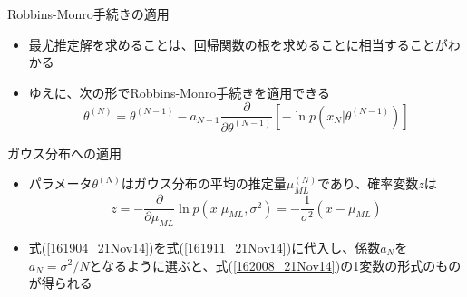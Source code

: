 \begin{frame}{Robbins-Monro手続きの適用}
 \begin{itemize}
  \item 最尤推定解を求めることは、回帰関数の根を求めることに相当することがわかる
  \item ゆえに、次の形でRobbins-Monro手続きを適用できる
        \begin{equation}
         \theta^{(N)}=\theta^{(N-1)}-a_{N-1}\frac{\partial}{\partial \theta^{(N-1)}}[-\ln p(x_N|\theta^{(N-1)})]\label{161911_21Nov14}
        \end{equation}
 \end{itemize}
\end{frame}

\begin{frame}{ガウス分布への適用}
 \begin{itemize}
  \item パラメータ$\theta^{(N)}$はガウス分布の平均の推定量$\mu_{ML}^{(N)}$であり、確率変数$z$は
        \begin{equation}
         z=-\frac{\partial}{\partial \mu_{ML}} \ln p(x|\mu_{ML}, \sigma^2) = -\frac{1}{\sigma^2}(x-\mu_{ML})\label{161904_21Nov14}
        \end{equation}
  \item 式(\ref{161904_21Nov14})を式(\ref{161911_21Nov14})に代入し、係数$a_N$を$a_N=\sigma^2/N$となるように選ぶと、式(\ref{162008_21Nov14})の1変数の形式のものが得られる
 \end{itemize}
\end{frame}
